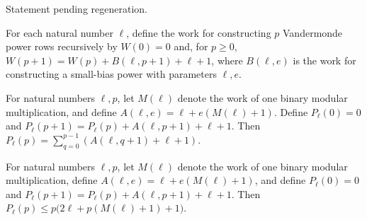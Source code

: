 \begin{theorem}
\label{FABL.executableVandermondeSubspace_card_le}
\leanok
{}
Statement pending regeneration.
\end{theorem}

\begin{definition}
\label{FABL.executableVandermondePowerRowsWork}
\leanok
{}
For each natural number $\ell$, define the work for constructing $p$ Vandermonde power
rows recursively by $W(0)=0$ and, for $p\ge 0$, $W(p+1)=W(p)+B(\ell,p+1)+\ell+1$, where
$B(\ell,e)$ is the work for constructing a small-bias power with parameters $\ell,e$.
\end{definition}

\begin{theorem}
\label{FABL.executableVandermondePowerRowsWork_eq_sum}
\leanok
{}
For natural numbers $\ell,p$, let $M(\ell)$ denote the work of one binary modular
multiplication, and define $A(\ell,e)=\ell+e(M(\ell)+1)$. Define $P_\ell(0)=0$ and
$P_\ell(p+1)=P_\ell(p)+A(\ell,p+1)+\ell+1$. Then
$P_\ell(p)=\sum_{q=0}^{p-1}(A(\ell,q+1)+\ell+1)$.
\end{theorem}

\begin{theorem}
\label{FABL.executableVandermondePowerRowsWork_le}
\leanok
{}
For natural numbers $\ell,p$, let $M(\ell)$ denote the work of one binary modular
multiplication, define $A(\ell,e)=\ell+e(M(\ell)+1)$, and define $P_\ell(0)=0$ and
$P_\ell(p+1)=P_\ell(p)+A(\ell,p+1)+\ell+1$. Then $P_\ell(p)\le
p\bigl(2\ell+p(M(\ell)+1)+1\bigr)$.
\end{theorem}

